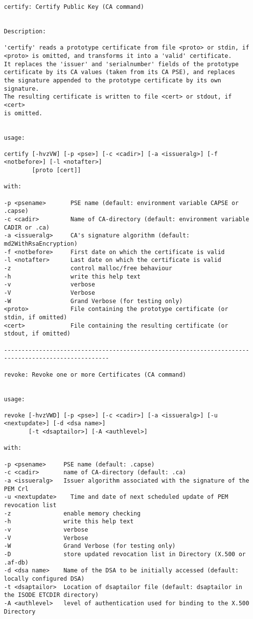 {\begin{verbatim}
certify: Certify Public Key (CA command)


Description:

'certify' reads a prototype certificate from file <proto> or stdin, if
<proto> is omitted, and transforms it into a 'valid' certificate.
It replaces the 'issuer' and 'serialnumber' fields of the prototype
certificate by its CA values (taken from its CA PSE), and replaces
the signature appended to the prototype certificate by its own signature.
The resulting certificate is written to file <cert> or stdout, if <cert>
is omitted.


usage:

certify [-hvzVW] [-p <pse>] [-c <cadir>] [-a <issueralg>] [-f <notbefore>] [-l <notafter>]
        [proto [cert]]

with:

-p <psename>       PSE name (default: environment variable CAPSE or .capse)
-c <cadir>         Name of CA-directory (default: environment variable CADIR or .ca)
-a <issueralg>     CA's signature algorithm (default: md2WithRsaEncryption)
-f <notbefore>     First date on which the certificate is valid
-l <notafter>      Last date on which the certificate is valid
-z                 control malloc/free behaviour
-h                 write this help text
-v                 verbose
-V                 Verbose
-W                 Grand Verbose (for testing only)
<proto>            File containing the prototype certificate (or stdin, if omitted)
<cert>             File containing the resulting certificate (or stdout, if omitted)

----------------------------------------------------------------------------------------------------

revoke: Revoke one or more Certificates (CA command)


usage:

revoke [-hvzVWD] [-p <pse>] [-c <cadir>] [-a <issueralg>] [-u <nextupdate>] [-d <dsa name>]
       [-t <dsaptailor>] [-A <authlevel>]

with:

-p <psename>     PSE name (default: .capse)
-c <cadir>       name of CA-directory (default: .ca)
-a <issueralg>   Issuer algorithm associated with the signature of the PEM Crl
-u <nextupdate>    Time and date of next scheduled update of PEM revocation list
-z               enable memory checking
-h               write this help text
-v               verbose
-V               Verbose
-W               Grand Verbose (for testing only)
-D               store updated revocation list in Directory (X.500 or .af-db)
-d <dsa name>    Name of the DSA to be initially accessed (default: locally configured DSA)
-t <dsaptailor>  Location of dsaptailor file (default: dsaptailor in the ISODE ETCDIR directory)
-A <authlevel>   level of authentication used for binding to the X.500 Directory


\end{verbatim}}

